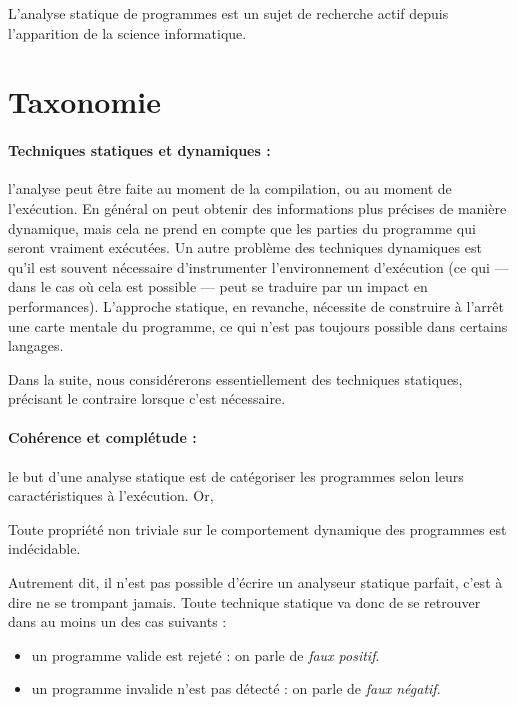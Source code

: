 L'analyse statique de programmes est un sujet de recherche actif depuis
l'apparition de la science informatique.

\section{Taxonomie}

\paragraph{Techniques statiques et dynamiques :} l'analyse peut être faite au
moment de la compilation, ou au moment de l'exécution. En général on peut
obtenir des informations plus précises de manière dynamique, mais cela ne prend
en compte que les parties du programme qui seront vraiment exécutées. Un autre
problème des techniques dynamiques est qu'il est souvent nécessaire
d'instrumenter l'environnement d'exécution (ce qui --- dans le cas où cela est
possible --- peut se traduire par un impact en performances). L'approche
statique, en revanche, nécessite de construire à l'arrêt une carte mentale du
programme, ce qui n'est pas toujours possible dans certains langages.

Dans la suite, nous considérerons essentiellement des techniques statiques,
précisant le contraire lorsque c'est nécessaire.

\paragraph{Cohérence et complétude :} le but d'une analyse statique est de
catégoriser les programmes selon leurs caractéristiques à l'exécution. Or,

\begin{theorem}[de Rice]
  Toute propriété non triviale sur le comportement dynamique des programmes est
  indécidable.\cite{rice}
\end{theorem}

Autrement dit, il n'est pas possible d'écrire un analyseur statique parfait,
c'est à dire ne se trompant jamais. Toute technique statique va donc de se
retrouver dans au moins un des cas suivants :

\begin{itemize}
\item
  un programme valide est rejeté : on parle de \emph{faux positif}.
\item
  un programme invalide n'est pas détecté : on parle de
  \emph{faux négatif}.
\end{itemize}

